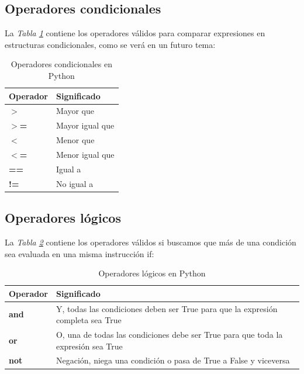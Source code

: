 \subsection{Operadores condicionales}
\hspace{0.55cm}La \textit{Tabla \ref{tab: 3}} contiene los operadores válidos para comparar expresiones en estructuras condicionales, como se verá en un futuro tema:
\begin{table}[H]
    \begin{center}
        \caption{Operadores condicionales en Python}
        \label{tab: 3}
        \begin{tabular}{l|l}
            \hline
            \textbf{Operador} & \textbf{Significado} \\
            \hline
            \textbf{$>$}		& Mayor que \\
            \textbf{$>$=}	& Mayor igual que \\
            \textbf{$<$}		& Menor que \\
            \textbf{$<$=}	& Menor igual que \\
            \textbf{==}		& Igual a \\
            \textbf{!=}		& No igual a \\
            \hline
        \end{tabular}
    \end{center}
\end{table}


\subsection{Operadores lógicos}
\hspace{0.55cm}La \textit{Tabla \ref{tab: 4}} contiene los operadores válidos si buscamos que más de una condición sea evaluada en una misma instrucción if:
\begin{table}[H]
    \begin{center}
        \caption{Operadores lógicos en Python}
        \label{tab: 4}
        \begin{tabular}{l|l}
            \hline
            \textbf{Operador} & \textbf{Significado} \\
            \hline
            \textbf{and	}	& Y, todas las condiciones deben ser True para que la expresión completa sea True \\
            \textbf{or}		& O, una de todas las condiciones debe ser True para que toda la expresión sea True \\
            \textbf{not}		& Negación, niega una condición o pasa de True a False y viceversa \\
            \hline
        \end{tabular}
    \end{center}
\end{table}



